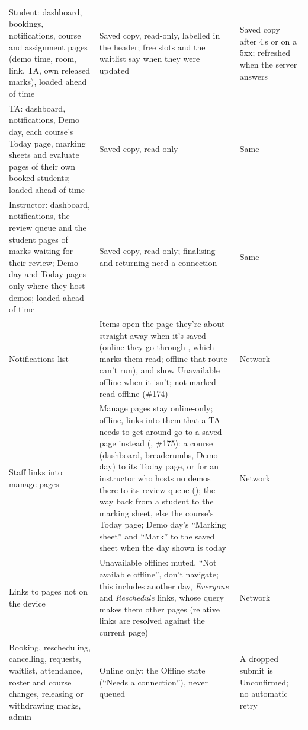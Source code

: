 {\tablefont
\begin{xltabular}{\linewidth}{@{}P{52mm} L L@{}}
  \toprule
   &  & \\
  \midrule
  \endhead
  Student: dashboard, bookings, notifications, course and assignment pages (demo time, room, link, TA, own released marks), loaded ahead of time & Saved copy, read-only, labelled in the header; free slots and the waitlist say when they were updated & Saved copy after 4\,s or on a 5xx; refreshed when the server answers\\
  TA: dashboard, notifications, Demo day, each course's Today page, marking sheets and evaluate pages of their own booked students; loaded ahead of time & Saved copy, read-only & Same\\
  Instructor: dashboard, notifications, the review queue and the student pages of marks waiting for their review; Demo day and Today pages only where they host demos; loaded ahead of time & Saved copy, read-only; finalising and returning need a connection & Same\\
  Notifications list & Items open the page they're about straight away when it's saved (online they go through , which marks them read; offline that route can't run), and show Unavailable offline when it isn't; not marked read offline (\#174) & Network\\
  Staff links into manage pages & Manage pages stay online-only; offline, links into them that a TA needs to get around go to a saved page instead (, \#175): a course (dashboard, breadcrumbs, Demo day) to its Today page, or for an instructor who hosts no demos there to its review queue (); the way back from a student to the marking sheet, else the course's Today page; Demo day's ``Marking sheet'' and ``Mark'' to the saved sheet when the day shown is today & Network\\
  Links to pages not on the device & Unavailable offline: muted, ``Not available offline'', don't navigate; this includes another day, \emph{Everyone} and \emph{Reschedule} links, whose query makes them other pages (relative links are resolved against the current page) & Network\\
  Booking, rescheduling, cancelling, requests, waitlist, attendance, roster and course changes, releasing or withdrawing marks, admin & Online only: the Offline state (``Needs a connection''), never queued & A dropped submit is Unconfirmed; no automatic retry\\

\end{xltabular}}

